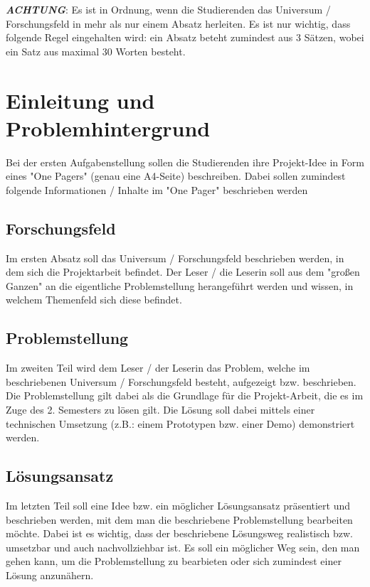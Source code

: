 \textbf{\textit{ACHTUNG}}: Es ist in Ordnung, wenn die Studierenden das Universum / Forschungsfeld in mehr als nur einem Absatz herleiten.
Es ist nur wichtig, dass folgende Regel eingehalten wird: ein Absatz beteht zumindest aus 3 Sätzen, wobei ein Satz aus maximal 30 Worten besteht.

\section{Einleitung und Problemhintergrund}
Bei der ersten Aufgabenstellung sollen die Studierenden ihre Projekt-Idee in Form eines "One Pagers" (genau eine A4-Seite) beschreiben.
Dabei sollen zumindest folgende Informationen / Inhalte im "One Pager" beschrieben werden

\subsection{Forschungsfeld}
Im ersten Absatz soll das Universum / Forschungsfeld beschrieben werden, in dem sich die Projektarbeit befindet. Der Leser / die Leserin soll aus dem "großen Ganzen" an die eigentliche Problemstellung
herangeführt werden und wissen, in welchem Themenfeld sich diese befindet.

\subsection{Problemstellung}
Im zweiten Teil wird dem Leser / der Leserin das Problem, welche im beschriebenen Universum / Forschungsfeld besteht, aufgezeigt bzw. beschrieben.
Die Problemstellung gilt dabei als die Grundlage für die Projekt-Arbeit, die es im Zuge des 2. Semesters zu lösen gilt.
Die Lösung soll dabei mittels einer technischen Umsetzung (z.B.: einem Prototypen bzw. einer Demo) demonstriert werden.

\subsection{Lösungsansatz}
Im letzten Teil soll eine Idee bzw. ein möglicher Lösungsansatz präsentiert und beschrieben werden, mit dem man die beschriebene Problemstellung bearbeiten möchte.
Dabei ist es wichtig, dass der beschriebene Lösungsweg realistisch bzw. umsetzbar und auch nachvollziehbar ist.
Es soll ein möglicher Weg sein, den man gehen kann, um die Problemstellung zu bearbieten oder sich zumindest einer Lösung anzunähern.
